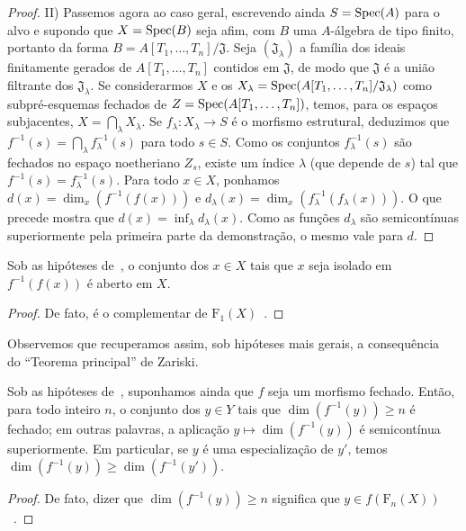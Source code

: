 \begin{proof}
II) Passemos agora ao caso geral, escrevendo ainda $S=\operatorname{Spec}(A)$
para o alvo e supondo que $X=\operatorname{Spec}(B)$ seja afim,
com $B$ uma $A$-álgebra de tipo finito, portanto da forma
$B=A[T_1,\ldots,T_n]/\mathfrak{J}$.
Seja $(\mathfrak{J}_\lambda)$ a família dos ideais finitamente gerados de
$A[T_1,\ldots,T_n]$ contidos em $\mathfrak{J}$,
de modo que $\mathfrak{J}$ é a união filtrante dos $\mathfrak{J}_\lambda$.
Se considerarmos $X$ e os
$X_\lambda=\operatorname{Spec}(A[T_1,\ldots,T_n]/\mathfrak{J}_\lambda)$
como subpré-esquemas fechados de $Z=\operatorname{Spec}(A[T_1,\ldots,T_n])$,
temos, para os espaços subjacentes, $X=\bigcap_\lambda X_\lambda$.
Se $f_\lambda:X_\lambda\to S$ é o morfismo estrutural,
deduzimos que $f^{-1}(s)=\bigcap_\lambda f_\lambda^{-1}(s)$
para todo $s\in S$.
Como os conjuntos $f_\lambda^{-1}(s)$ são fechados no espaço noetheriano $Z_s$,
existe um índice $\lambda$ (que depende de $s$)
tal que $f^{-1}(s)=f_\lambda^{-1}(s)$.
Para todo $x\in X$, ponhamos $d(x)=\dim_x(f^{-1}(f(x)))$ e
$d_\lambda(x)=\dim_x(f_\lambda^{-1}(f_\lambda(x)))$.
O que precede mostra que $d(x)=\inf_\lambda d_\lambda(x)$.
Como as funções $d_\lambda$ são semicontínuas superiormente
pela primeira parte da demonstração, o mesmo vale para $d$.
\end{proof}

\begin{corollary}[13.1.4]
\label{IV.13.1.4}
Sob as hipóteses de~, o conjunto dos $x\in X$
tais que $x$ seja isolado em $f^{-1}(f(x))$ é aberto em $X$.
\end{corollary}

\begin{proof}
De fato, é o complementar de $\mathrm{F}_1(X)$~.
\end{proof}

Observemos que recuperamos assim, sob hipóteses mais gerais,
a consequência~ do “Teorema principal” de Zariski.

\begin{corollary}[13.1.5]
\label{IV.13.1.5}
Sob as hipóteses de~, suponhamos ainda que $f$
seja um morfismo fechado.
Então, para todo inteiro $n$, o conjunto dos $y\in Y$ tais que
$\dim(f^{-1}(y))\geq n$ é fechado; em outras palavras, a aplicação
$y\mapsto\dim(f^{-1}(y))$ é semicontínua superiormente.
Em particular, se $y$ é uma especialização de $y'$,
temos $\dim(f^{-1}(y))\geq\dim(f^{-1}(y'))$.
\end{corollary}

\begin{proof}
De fato, dizer que $\dim(f^{-1}(y))\geq n$ significa que
$y\in f(\mathrm{F}_n(X))$~.
\end{proof}

